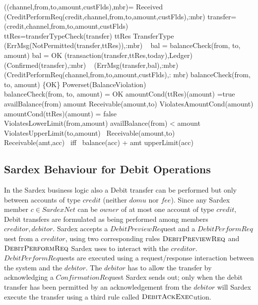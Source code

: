 \begin{asm}
((channel,from,to,amount,custFlds),mbr)=\+
\IF Received
   (CreditPerformReq(credit,channel,from,to,amount,custFlds),\FROM :mbr) \THEN \+  \LET transfer=(credit,channel,from,to,amount,custFlds) \\
    \LET ttRes=transferTypeCheck(transfer)  \+
      \IF ttRes \not \in TransferType \THEN \+ (ErrMsg(NotPermitted(transfer,ttRes)),\TO :mbr)\-
       \ELSE~ 
       \LET bal = balanceCheck(from, to, amount) \+
              \IF bal = OK \+
                 \THEN \+
                      (transaction(transfer,ttRes,today),Ledger)\\
                      (Confirmed(transfer),\TO :mbr)\-
                \ELSE ~ (ErrMsg(transfer,bal),\TO :mbr)\dec\dec\-
    (CreditPerformReq(channel,from,to,amount,custFlds),\FROM : mbr) \dec\-
\WHERE \+
balanceCheck(from, to, amount) \in \{OK\} 
                  \cup Powerset(BalanceViolation)\\
balanceCheck(from, to, amount) = OK \IFF 
         amountCond(ttRes)(amount) =true \AND \+
         availBalance(from) \geq amount  \AND Receivable(amount,to)\-
ViolatesAmountCond(amount) \IF  amountCond(ttRes)(amount) = false \\
ViolatesLowerLimit(from,amount) \IF availBalance(from) < amount \\
ViolatesUpperLimit(to,amount) \IF ~\NOT Receivable(amount,to) \\
 Receivable(amt,acc) \mbox{ iff } balance(acc) + amt \leq upperLimit(acc)
\end{asm}



\subsection{Sardex Behaviour for Debit Operations}
\label{sec:debitop}

In the Sardex business logic also a Debit transfer can be performed but only between accounts of type $credit$ (neither $domu$ nor $fee$). Since any Sardex member $c \in SardexNet$ can be $owner$ of at most one account of type $credit$, Debit transfers are formulated as being performed among members $creditor,debitor$. Sardex accepts a $DebitPreviewReq$uest and a  $DebitPerformReq$uest from a $creditor$, using two corresponding rules $\hbox{\sc DebitPreviewReq}$ and $\hbox{\sc DebitPerformReq}$ Sardex uses to interact with the $creditor$.  $DebitPerformReq$uests are executed using a request/response interaction between the system and the $debitor$. The $debitor$ has to allow the transfer by acknowledging a $ConfirmationReq$uest Sardex sends out; only when the debit transfer has been permitted by an acknowledgement from the $debitor$ will Sardex execute the transfer using a third rule called $\hbox{\sc DebitAckExec}$ution. 

